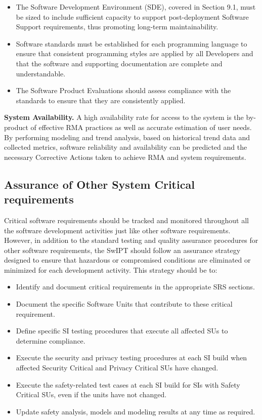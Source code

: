 \begin{itemize}
	\renewcommand{\labelitemi}{\scriptsize$\blacksquare$}
	\item The Software Development Environment (SDE),
	covered in Section 9.1, must be sized to include sufficient capacity to support post-deployment Software
	Support requirements, thus promoting long-term
	maintainability.
	\item Software standards must be established for each programming language to ensure that consistent programming styles are applied by all Developers and that the
	software and supporting documentation are complete
	and understandable.
	\item The Software Product Evaluations should assess compliance with the standards to ensure that they are consistently applied.
\end{itemize}

\textbf{System Availability.} A high availability rate for access
to the system is the by-product of effective RMA practices
as well as accurate estimation of user needs. By performing
modeling and trend analysis, based on historical trend data
and collected metrics, software reliability and availability
can be predicted and the necessary Corrective Actions taken
to achieve RMA and system requirements.

\subsection{Assurance of Other System Critical requirements}

Critical software requirements should be tracked and monitored throughout all the software development activities just
like other software requirements. However, in addition to
the standard testing and quality assurance procedures for
other software requirements, the SwIPT should follow an
assurance strategy designed to ensure that hazardous or compromised conditions are eliminated or minimized for each
development activity. This strategy should be to:

\begin{itemize}
	\renewcommand{\labelitemi}{\scriptsize$\blacksquare$}
	\item Identify and document critical requirements in the
	appropriate SRS sections.
	\item Document the specific Software Units that contribute
	to these critical requirement.
	\item Define specific SI testing procedures that execute all
	affected SUs to determine compliance.
	\item Execute the security and privacy testing procedures
	at each SI build when affected Security Critical and
	Privacy Critical SUs have changed.
	\item Execute the safety-related test cases at each SI build for
	SIs with Safety Critical SUs, even if the units have not
	changed.
	\item Update safety analysis, models and modeling results at
	any time as required.
\end{itemize}

